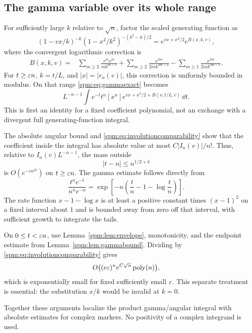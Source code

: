 \subsection{The gamma variable over its whole range}
For sufficiently large $k$ relative to $\sqrt n$, factor the scaled generating function as
\begin{equation}\label{spm:eq:factor}
 (1-vx/k)^{-k}(1-x^2/k^2)^{-(k^2-k)/2}
 =e^{vx+x^2/2}e^{B(x,k,v)},
\end{equation}
where the convergent logarithmic correction is
\begin{align}\label{spm:eq:B}
 B(x,k,v)={}&\sum_{m\geq2}\frac{v^m x^m}{m k^{m-1}}
 +\sum_{m\geq2}\frac{x^{2m}}{2m k^{2m-2}}
 -\sum_{m\geq1}\frac{x^{2m}}{2m k^{2m-1}}.
\end{align}
For $t\geq\varepsilon n$, $k=t/L$, and $|x|=|r_n(v)|$, this correction is uniformly bounded in modulus. On that range \eqref{spm:eq:gammaexact} becomes
\begin{equation}\label{spm:eq:mainintegral}
 L^{-n-1}\int e^{-t}t^n
 [x^n]e^{vx+x^2/2+B(x,t/L,v)}\,\dd t.
\end{equation}
This is first an identity for a fixed coefficient polynomial, not an exchange with a divergent full generating-function integral.

The absolute angular bound and \eqref{spm:eq:involutioncomparability} show that the coefficient inside the integral has absolute value at most $C|I_n(v)|/n!$. Thus, relative to $I_n(v)L^{-n-1}$, the mass outside
\begin{equation}\label{spm:eq:gammawindow}
 |t-n|\leq n^{1/2+\delta}
\end{equation}
is $O(e^{-c n^{2\delta}})$ on $t\geq\varepsilon n$. The gamma estimate follows directly from
\[
 \frac{t^ne^{-t}}{n^ne^{-n}}
 =\exp\left[-n\left(\frac tn-1-\log\frac tn\right)\right].
\]
The rate function $x-1-\log x$ is at least a positive constant times $(x-1)^2$ on a fixed interval about $1$ and is bounded away from zero off that interval, with sufficient growth to integrate the tails.

On $0\leq t<\varepsilon n$, use Lemma~\ref{spm:lem:envelope}, monotonicity, and the endpoint estimate from Lemma~\ref{spm:lem:gammabound}. Dividing by \eqref{spm:eq:involutioncomparability} gives
\[
 O\bigl((e\varepsilon)^n e^{C\sqrt n}\operatorname{poly}(n)\bigr),
\]
which is exponentially small for fixed sufficiently small $\varepsilon$. This separate treatment is essential: the substitution $x/k$ would be invalid at $k=0$.

Together these arguments localize the product gamma/angular integral with absolute estimates for complex markers. No positivity of a complex integrand is used.

